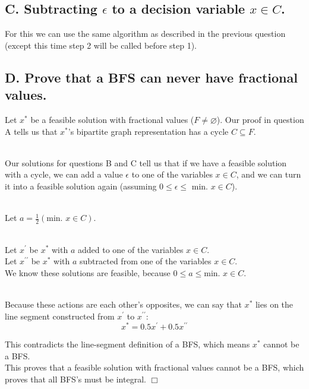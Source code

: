 \documentclass[12pt]{article}
\begin{document}
\subsection{C. Subtracting $\epsilon$ to a decision variable $x \in C$.}
For this we can use the same algorithm as described in the previous question (except this time step 2 will be called before step 1).

\newpage
\subsection{D. Prove that a BFS can never have fractional values.}
Let $x^*$ be a feasible solution with fractional values ($F \neq \varnothing$).
Our proof in question A tells us that $x^*$'s bipartite graph representation has a cycle $C \subseteq F$. 

\noindent
\\
Our solutions for questions B and C tell us that if we have a feasible solution with a cycle, we can add a value $\epsilon$ to one of the variables $x \in C$, and we can turn it into a feasible solution again (assuming $0 \leq \epsilon \leq \text{ min. }x \in C$).

\noindent
\\
Let $a = \frac{1}{2} (\text{min. } x \in C)$.

\noindent
\\
Let $x^\prime$ be $x^*$ with $a$ added to one of the variables $x \in C$.\\
Let $x^{\prime\prime}$ be $x^*$ with $a$ subtracted from one of the variables $x \in C$.\\
We know these solutions are feasible, because $0 \leq a \leq \text{min. } x \in C$.

\noindent
\\
Because these actions are each other's opposites, we can say that $x^*$ lies on the line segment constructed from $x^\prime$ to $x^{\prime\prime}$:
\[ x^* = 0.5 x^\prime + 0.5 x^{\prime\prime} \]

\noindent
This contradicts the line-segment definition of a BFS, which means $x^*$ cannot be a BFS.\\
This proves that a feasible solution with fractional values cannot be a BFS, which proves that all BFS's must be integral. $\Box$
\end{document}
